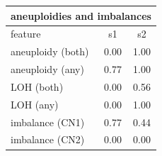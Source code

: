 \documentclass{standalone}
\begin{document}
\begin{tabular}{|l|c|c|}
\hline
\multicolumn{3}{|c|}{\textbf{aneuploidies and imbalances}}\\
\hline 

feature & s1 & s2 \\
\hline
aneuploidy (both) & 0.00 & 1.00 \\
aneuploidy (any) & 0.77 & 1.00 \\
LOH (both) & 0.00 & 0.56 \\
LOH (any) & 0.00 & 1.00 \\
imbalance (CN1) & 0.77 & 0.44 \\
imbalance (CN2) & 0.00 & 0.00 \\
\hline
\end{tabular}
\end{document}
